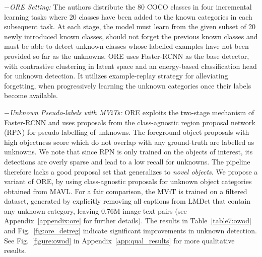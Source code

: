 \documentclass[runningheads]{llncs}
\begin{document}
\noindent
$-$\textit{ORE Setting:} The authors distribute the 80 COCO \cite{coco} classes in four incremental learning tasks where 20 classes have been added to the known categories in each subsequent task. At each stage, the model must learn from the given subset of 20 newly introduced known classes, should not forget the previous known classes and must be able to detect unknown classes whose labelled examples have not been provided so far as the unknowns. ORE uses Faster-RCNN \cite{ren2015faster} as the base detector, with contrastive clustering in latent space and an energy-based classification head for unknown detection. It utilizes example-replay strategy \cite{wang2020frustratingly} for alleviating forgetting, when progressively learning the unknown categories once their labels become available. 

\noindent
$-$\textit{Unknown Pseudo-labels with MViTs:} ORE exploits the two-stage mechanism of Faster-RCNN \cite{ren2015faster} and uses proposals from the class-agnostic region proposal network (RPN) for pseudo-labelling of unknowns. The foreground object proposals with high objectness score which do not overlap with any ground-truth are labelled as unknowns. We note that since RPN is only trained on the objects of interest, its detections are overly sparse and lead to a low recall for unknowns. The pipeline therefore lacks a good proposal set that generalizes to \emph{novel objects}. We propose a variant of ORE, by using class-agnostic proposals for unknown object categories obtained from MAVL. For a fair comparison, the MViT is trained on a filtered dataset, generated by explicitly removing all captions from LMDet that contain any unknown category, leaving 0.76M image-text pairs {(see Appendix~\ref{appendix:ore} for further details)}. The results in Table~\ref{table7:owod} and Fig.~\ref{fig:ore_detreg} indicate significant improvements in unknown detection. {See Fig.~\ref{figure:owod} in Appendix~\ref{app:qual_results} for more qualitative results}.
\end{document}
